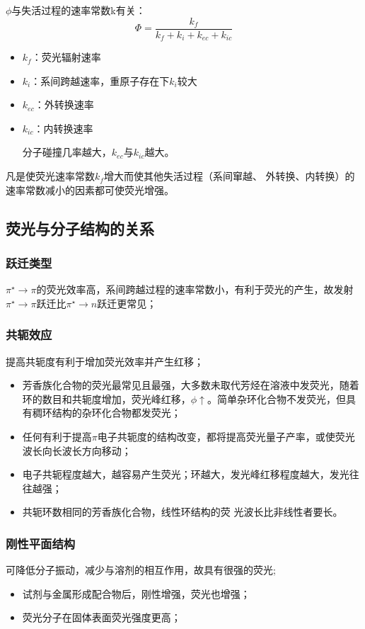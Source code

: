 $\phi$与失活过程的速率常数k有关：
\begin{equation}
	\Phi =\frac{k_{f}}{k_{f}+k_{i}+k_{ec}+k_{ic}}
\end{equation}
\begin{note}
	\begin{itemize}
		\item $k_{f}$：荧光辐射速率
		\item $k_{i}$：系间跨越速率，重原子存在下$k_{i}$较大
		\item $k_{ec}$：外转换速率
		\item $k_{ic}$：内转换速率
		
		分子碰撞几率越大，$k_{ec}$与$k_{ic}$越大。	
	\end{itemize}
\end{note}
凡是使荧光速率常数$k_{f}$增大而使其他失活过程（系间窜越、 外转换、内转换）的速率常数减小的因素都可使荧光增强。

\subsection{荧光与分子结构的关系}
\subsubsection{跃迁类型}
$\pi^{\star} \rightarrow \pi$的荧光效率高，系间跨越过程的速率常数小，有利于荧光的产生，故发射 $\pi^{\star} \rightarrow \pi$跃迁比$\pi^{\star} \rightarrow n$跃迁更常见；

\subsubsection{共轭效应}
提高共轭度有利于增加荧光效率并产生红移；
\begin{itemize}
	\item 芳香族化合物的荧光最常见且最强，大多数未取代芳烃在溶液中发荧光，随着环的数目和共轭度增加，荧光峰红移，$\phi \uparrow$。简单杂环化合物不发荧光，但具有稠环结构的杂环化合物都发荧光；
	\item 任何有利于提高$\pi$电子共轭度的结构改变，都将提高荧光量子产率，或使荧光波长向长波长方向移动；
	\item 电子共轭程度越大，越容易产生荧光；环越大，发光峰红移程度越大，发光往往越强；
	\item 共轭环数相同的芳香族化合物，线性环结构的荧 光波长比非线性者要长。
\end{itemize}

\subsubsection{刚性平面结构}
可降低分子振动，减少与溶剂的相互作用，故具有很强的荧光;
\begin{itemize}
	\item 试剂与金属形成配合物后，刚性增强，荧光也增强；
	\item 荧光分子在固体表面荧光强度更高；
\end{itemize}
